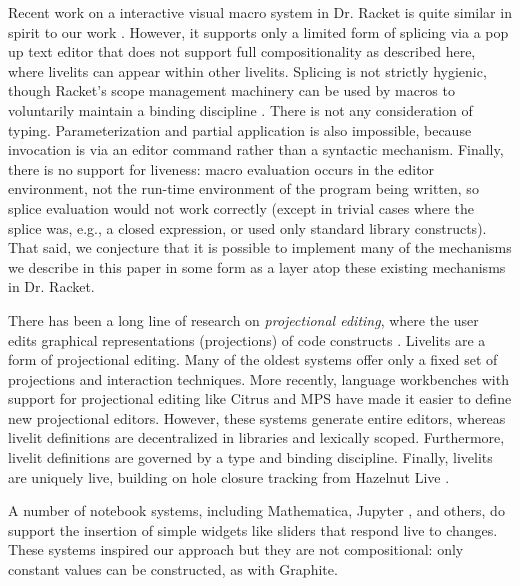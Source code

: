 Recent work on a interactive visual macro system in Dr. Racket 
is quite similar in spirit to our work \cite{interactive-visual-syntax}.
However, it supports only a limited form of splicing via a pop up text editor
that does not support full compositionality as described here, where livelits 
can appear within other livelits. Splicing is not strictly hygienic, though 
Racket's scope management machinery can be used by macros to voluntarily 
maintain a binding discipline \cite{DBLP:conf/popl/Flatt16}. There is not any 
consideration of typing. Parameterization and partial application is also impossible, because invocation 
is via an editor command rather than a syntactic mechanism. Finally,
there is no support for liveness: macro evaluation occurs in the editor 
environment, not the run-time environment of the program being written, 
so splice evaluation would not work correctly (except in trivial cases
where the splice was, e.g., a closed expression, or used only standard 
library constructs). That said, we conjecture that it is
possible to implement many of the mechanisms we describe in this paper 
in some form as a layer atop these existing mechanisms in Dr. Racket.

There has been a long line of research on \emph{projectional editing}, where
the user edits graphical representations (projections) of code constructs 
\cite{DBLP:journals/ile/MillerPMV94,read1996generating,DBLP:conf/sde/Reiss84,DBLP:conf/uist/KoM05}. Livelits are a form of projectional editing. 
Many of the oldest systems offer only a fixed set of projections and interaction techniques. 
More recently, language workbenches with support for projectional editing like Citrus \cite{DBLP:conf/uist/KoM05}
and MPS \cite{voelter2011language} have made it easier to define new projectional editors.
However, these systems generate entire editors, whereas livelit definitions 
are decentralized in libraries and lexically scoped. 
Furthermore, livelit definitions are governed by a type and binding discipline.
Finally, livelits are uniquely live, building on hole closure tracking 
from Hazelnut Live \cite{HazelnutLive}.

A number of notebook systems, including Mathematica, Jupyter \cite{Guo13}, and others, do 
support the insertion of simple widgets like sliders that respond live to changes.
These systems inspired our approach but they are not compositional: only constant values can be constructed, as with Graphite.

